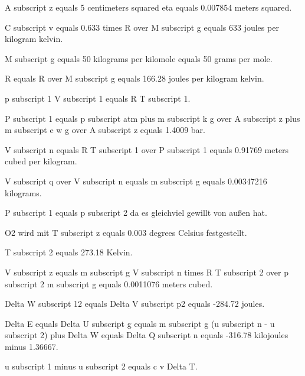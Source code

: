 A subscript z equals 5 centimeters squared eta equals 0.007854 meters squared.

C subscript v equals 0.633 times R over M subscript g equals 633 joules per kilogram kelvin.

M subscript g equals 50 kilograms per kilomole equals 50 grams per mole.

R equals R over M subscript g equals 166.28 joules per kilogram kelvin.

p subscript 1 V subscript 1 equals R T subscript 1.

P subscript 1 equals p subscript atm plus m subscript k g over A subscript z plus m subscript e w g over A subscript z equals 1.4009 bar.

V subscript n equals R T subscript 1 over P subscript 1 equals 0.91769 meters cubed per kilogram.

V subscript q over V subscript n equals m subscript g equals 0.00347216 kilograms.

P subscript 1 equals p subscript 2 da es gleichviel gewillt von außen hat.

O2 wird mit T subscript z equals 0.003 degrees Celsius festgestellt.

T subscript 2 equals 273.18 Kelvin.

V subscript z equals m subscript g V subscript n times R T subscript 2 over p subscript 2 m subscript g equals 0.0011076 meters cubed.

Delta W subscript 12 equals Delta V subscript p2 equals -284.72 joules.

Delta E equals Delta U subscript g equals m subscript g (u subscript n - u subscript 2) plus Delta W equals Delta Q subscript n equals -316.78 kilojoules minus 1.36667.

u subscript 1 minus u subscript 2 equals c v Delta T.